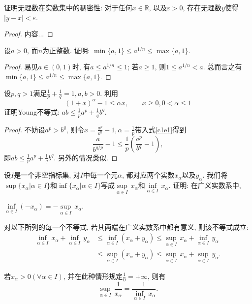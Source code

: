 \begin{quiza}
\begin{solution}
\end{solution}
\woe 证明无理数在实数集中的稠密性: 对于任何\(x\in \mathbb{R}\), 以及\(\varepsilon>0\), 存在无理数\(y\)使得\(|y-x|<\varepsilon\).
\begin{proof}
内容...
\end{proof}
\woe 设\(a>0\), 而\(n\)为正整数. 证明: \(\min \{a,1\}\leqslant a^{1/n}\leqslant\max\{a,1\}\).
\begin{proof}
易见\(a\in (0,1)\)时, 有\(a\leqslant a^{1/n}\leqslant 1\); 若\(a\geqslant1\), 则\(1\leqslant a^{1/n}<a\). 总而言之有 \(\min \{a,1\}\leqslant a^{1/n}\leqslant\max\{a,1\}\).
\end{proof}
\woe 设\(p,q>1\)满足\(\frac{1}{p}+\frac{1}{q}=1,a,b>0\). 利用
\begin{equation}\label{c1e1}\tag{\(\heartsuit\)}
(1+x)^\alpha-1\leqslant \alpha x,\qquad x\geqslant 0,0<\alpha\leqslant1
\end{equation}
证明Young不等式: \(ab\leqslant\frac{1}{p}a^p+\frac{1}{q}b^q\).
\begin{proof}
不妨设\(a^p>b^q\), 则令\(x=\frac{a^p}{b^q}-1,\alpha=\frac{1}{p}\)带入式\eqref{c1e1}得到\[\frac{a}{b^{q/p}}-1\leqslant \frac{1}{p}\left(\frac{a^p}{b^q}-1\right),\]即\(ab\leqslant\frac{1}{p}a^p+\frac{1}{q}b^q\). 另外的情况类似.
\end{proof}
\woestar 设\(I\)是一个非空指标集, 对\(I\)中每一个元\(\alpha\), 都对应两个实数\(x_\alpha\)以及\(y_\alpha\). 我们将\(\sup\{x_\alpha|\alpha\in I\}\)和\(\inf\{x_\alpha|\alpha\in I\}\)写成\(\underset{\alpha\in I}{\sup}\,x_\alpha\)和\(\underset{\alpha\in I}{\inf}\,x_\alpha\). 证明: 在广义实数系中,
\begin{quizs}
 \item \(\underset{\alpha\in I}{\inf}(-x_\alpha)=-\underset{\alpha\in I}{\sup}\,x_\alpha\).
\item 对以下所列的每一个不等式, 若其两端在广义实数系中都有意义, 则该不等式成立:\[\begin{split}
\underset{\alpha\in I}{\inf}\,x_\alpha+\underset{\alpha\in I}{\inf}\,y_\alpha&\leqslant\underset{\alpha\in I}{\inf}(x_\alpha+y_\alpha)\leqslant\underset{\alpha\in I}{\sup}\,x_\alpha+\underset{\alpha\in I}{\inf}\,y_\alpha\\&\leqslant\underset{\alpha\in I}{\sup}(x_\alpha+y_\alpha)\leqslant\underset{\alpha\in I}{\sup}\,x_\alpha+\underset{\alpha\in I}{\sup}\,y_\alpha.\end{split}\]
\item 若\(x_\alpha>0(\forall \alpha\in I)\), 并在此种情形规定\(\frac{1}{0}=+\infty\), 则有\[ \underset{\alpha\in I}{\sup}\,\frac{1}{x_\alpha}=\frac{1}{\underset{\alpha\in I}{\inf}\,x_\alpha}.\]

\end{quizs}
\end{quiza}
